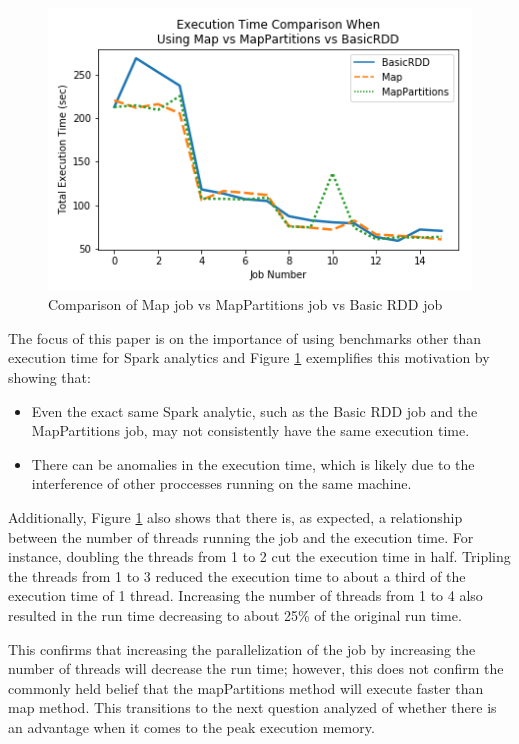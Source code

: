 \documentclass[conference]{IEEEtran}
\begin{document}
\begin{figure}
    \includegraphics[width=\linewidth]{../python_scripts/images/mapVsMapPartitionsAllExecutionTime.png}
    \caption{Comparison of Map job vs MapPartitions job vs Basic RDD job}
    \label{fig:mapVMapPartitionsAllExecTime}
\end{figure}

The focus of this paper is on the importance of using benchmarks other than execution time for Spark analytics and Figure \ref{fig:mapVMapPartitionsAllExecTime} exemplifies this motivation by showing that:
\begin{itemize}
\item Even the exact same Spark analytic, such as the Basic RDD job and the MapPartitions job, may not consistently have the same execution time.
\item There can be anomalies in the execution time, which is likely due to the interference of other proccesses running on the same machine.
\end{itemize}

Additionally, Figure \ref{fig:mapVMapPartitionsAllExecTime} also shows that there is, as expected, a relationship between the number of threads running the job and the execution time.
For instance, doubling the threads from 1 to 2 cut the execution time in half.
Tripling the threads from 1 to 3 reduced the execution time to about a third of the execution time of 1 thread.
Increasing the number of threads from 1 to 4 also resulted in the run time decreasing to about 25\% of the original run time.

This confirms that increasing the parallelization of the job by increasing the number of threads will decrease the run time;
however, this does not confirm the commonly held belief that the mapPartitions method will execute faster than map method.
This transitions to the next question analyzed of whether there is an advantage when it comes to the peak execution memory.
\end{document}
